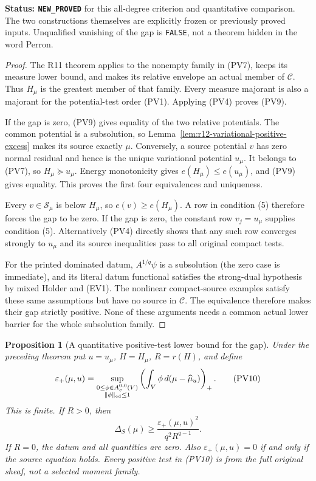 \documentclass[11pt,a4paper]{article}
\numberwithin{equation}{section}
\newtheorem{proposition}[theorem]{Proposition}
\theoremstyle{definition}
\theoremstyle{remark}
\begin{document}
\noindent\textbf{Status: \texttt{NEW\_PROVED}} for this
all-degree criterion and quantitative comparison. The two
constructions themselves are explicitly frozen or previously
proved inputs. Unqualified vanishing of the gap is
\texttt{FALSE}, not a theorem hidden in the word Perron.

\begin{proof}
The R11 theorem applies to the nonempty family in (PV7),
keeps its measure lower bound, and makes its relative
envelope an actual member of $\mathscr C$. Thus $H_\mu$
is the greatest member of that family. Every measure
majorant is also a majorant for the potential-test order
(PV1). Applying (PV4) proves (PV9).

If the gap is zero, (PV9) gives equality of the two
relative potentials. The common potential is a subsolution,
so Lemma~\ref{lem:r12-variational-positive-excess} makes
its source exactly $\mu$. Conversely, a source potential
$v$ has zero normal residual and hence is the unique
variational potential $u_\mu$. It belongs to (PV7), so
$H_\mu\succeq u_\mu$. Energy monotonicity gives
$e(H_\mu)\leq e(u_\mu)$, and (PV9) gives equality.
This proves the first four equivalences and uniqueness.

Every $v\in\mathscr S_\mu$ is below $H_\mu$, so
$e(v)\geq e(H_\mu)$. A row in condition (5) therefore
forces the gap to be zero. If the gap is zero, the
constant row $v_j=u_\mu$ supplies condition (5).
Alternatively (PV4) directly shows that any such row
converges strongly to $u_\mu$ and its source inequalities
pass to all original compact tests.

For the printed dominated datum, $A^{1/q}\psi$ is a
subsolution (the zero case is immediate), and its literal
datum functional satisfies the strong-dual hypothesis by
mixed Holder and (EV1). The nonlinear compact-source
examples satisfy these same assumptions but have no source
in $\mathscr C$. The equivalence therefore makes their
gap strictly positive. None of these arguments needs a
common actual lower barrier for the whole subsolution family.
\end{proof}

\begin{proposition}[A quantitative positive-test lower bound for the gap]
\label{prop:r12-positive-test-gap-bound}
Under the preceding theorem put $u=u_\mu$, $H=H_\mu$,
$R=r(H)$, and define
\[
 \varepsilon_+(\mu,u)=
   \sup_{\substack{0\leq\phi\in A_c^{0,0}(V)\\
                   \|\phi\|_{\rm ed}\leq1}}
                   \left(\int_V\phi\,d(\mu-\widehat\mu_u)\right)_+.
 \tag{PV10}
\]
This is finite. If $R>0$, then
\[
       \Delta_S(\mu)\geq
          \frac{\varepsilon_+(\mu,u)^2}{q^2R^{q-1}}.
 \tag{PV11}
\]
If $R=0$, the datum and all quantities are zero. Also
$\varepsilon_+(\mu,u)=0$ if and only if the source equation
holds. Every positive test in (PV10) is from the full
original sheaf, not a selected moment family.
\end{proposition}
\end{document}

